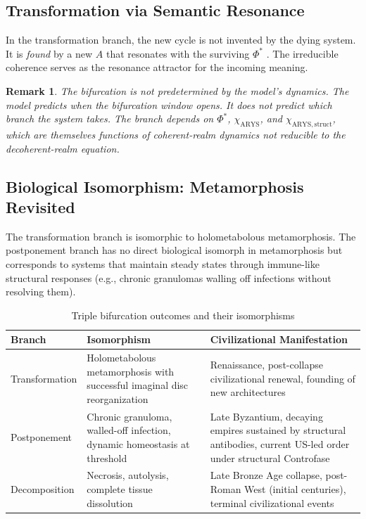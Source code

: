 \documentclass[12pt,a4paper]{article}
\newtheorem*{remark}{Remark}
\newcommand{\Phistar}{\Phi^{*}}
\newcommand{\Mpot}{A}
\begin{document}
\subsection{Transformation via Semantic Resonance}

In the transformation branch, the new cycle is not invented by the dying system. It is \emph{found} by a new $\Mpot$ that resonates with the surviving $\Phistar$ \cite{ost_teleodynamics}. The irreducible coherence serves as the resonance attractor for the incoming meaning.

\begin{remark}
The bifurcation is not predetermined by the model's dynamics. The model predicts \emph{when} the bifurcation window opens. It does not predict \emph{which branch} the system takes. The branch depends on $\Phistar$, $\chi_{\mathrm{ARYS}}$, and $\chi_{\mathrm{ARYS,struct}}$, which are themselves functions of coherent-realm dynamics not reducible to the decoherent-realm equation.
\end{remark}

\subsection{Biological Isomorphism: Metamorphosis Revisited}

The transformation branch is isomorphic to holometabolous metamorphosis. The postponement branch has no direct biological isomorph in metamorphosis but corresponds to systems that maintain steady states through immune-like structural responses (e.g., chronic granulomas walling off infections without resolving them).

\begin{table}[H]
\centering
\caption{Triple bifurcation outcomes and their isomorphisms}
\label{tab:triple_bif}
\begin{tabular}{@{}p{2.6cm}p{4.2cm}p{6cm}@{}}
\toprule
\textbf{Branch} & \textbf{Isomorphism} & \textbf{Civilizational Manifestation} \\
\midrule
Transformation & Holometabolous metamorphosis with successful imaginal disc reorganization & Renaissance, post-collapse civilizational renewal, founding of new architectures \\[0.4em]
Postponement & Chronic granuloma, walled-off infection, dynamic homeostasis at threshold & Late Byzantium, decaying empires sustained by structural antibodies, current US-led order under structural Controfase \\[0.4em]
Decomposition & Necrosis, autolysis, complete tissue dissolution & Late Bronze Age collapse, post-Roman West (initial centuries), terminal civilizational events \\
\bottomrule
\end{tabular}
\end{table}
\end{document}
